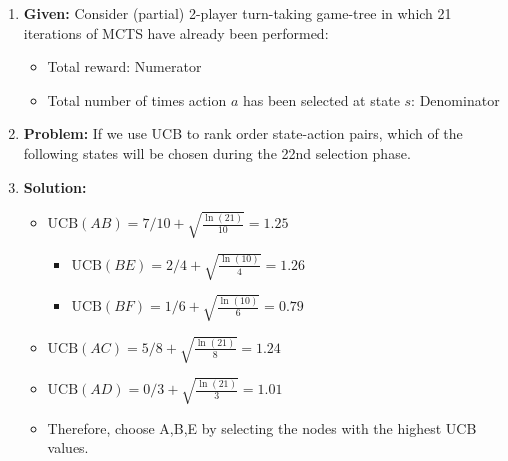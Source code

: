 \begin{example}
    \begin{enumerate}
        \item \textbf{Given:} Consider (partial) 2-player turn-taking game-tree in which 21 iterations of MCTS have already been performed: 
        \begin{itemize}
            \item Total reward: Numerator
            \item Total number of times action $a$ has been selected at state $s$: Denominator
        \end{itemize}
        \item \textbf{Problem:} If we use UCB to rank order state-action pairs, which of the following states will be chosen during the 22nd selection phase. 
        \item \textbf{Solution:}
        \begin{itemize}
            \item $\boxed{\text{UCB}(AB) = 7/10 + \sqrt{\frac{\ln(21)}{10}} = 1.25}$
            \begin{itemize}
                \item $\boxed{\text{UCB}(BE) = 2/4 + \sqrt{\frac{\ln(10)}{4}} = 1.26}$
                \item $\text{UCB}(BF) = 1/6 + \sqrt{\frac{\ln(10)}{6}} = 0.79$
            \end{itemize}
            \item $\text{UCB}(AC) = 5/8 + \sqrt{\frac{\ln(21)}{8}} = 1.24$
            \item $\text{UCB}(AD) = 0/3 + \sqrt{\frac{\ln(21)}{3}} = 1.01$
            \item Therefore, choose A,B,E by selecting the nodes with the highest UCB values.
        \end{itemize}
    \end{enumerate}
\end{example}
\newpage

